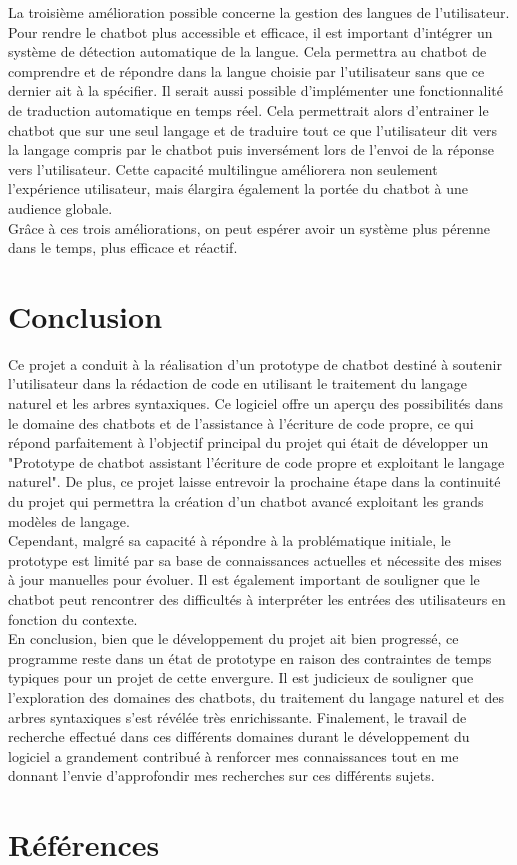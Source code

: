 \documentclass{rapport}
\begin{document}
La troisième amélioration possible concerne la gestion des langues de l'utilisateur. Pour rendre le chatbot plus accessible et efficace, il est important d'intégrer un système de détection automatique de la langue. Cela permettra au chatbot de comprendre et de répondre dans la langue choisie par l'utilisateur sans que ce dernier ait à la spécifier. Il serait aussi possible d'implémenter une fonctionnalité de traduction automatique en temps réel. Cela permettrait alors d'entrainer le chatbot que sur une seul langage et de traduire tout ce que l'utilisateur dit vers la langage compris par le chatbot puis inversément lors de l'envoi de la réponse vers l'utilisateur. Cette capacité multilingue améliorera non seulement l'expérience utilisateur, mais élargira également la portée du chatbot à une audience globale.\\

Grâce à ces trois améliorations, on peut espérer avoir un système plus pérenne dans le temps, plus efficace et réactif.
\newpage
\section{Conclusion}
\label{conclu}
Ce projet a conduit à la réalisation d'un prototype de chatbot destiné à soutenir l'utilisateur dans la rédaction de code en utilisant le traitement du langage naturel et les arbres syntaxiques. Ce logiciel offre un aperçu des possibilités dans le domaine des chatbots et de l'assistance à l'écriture de code propre, ce qui répond parfaitement à l'objectif principal du projet qui était de développer un "Prototype de chatbot assistant l'écriture de code propre et exploitant le langage naturel". De plus, ce projet laisse entrevoir la prochaine étape dans la continuité du projet qui permettra la création d'un chatbot avancé exploitant les grands modèles de langage.\\

Cependant, malgré sa capacité à répondre à la problématique initiale, le prototype est limité par sa base de connaissances actuelles et nécessite des mises à jour manuelles pour évoluer. Il est également important de souligner que le chatbot peut rencontrer des difficultés à interpréter les entrées des utilisateurs en fonction du contexte.\\

En conclusion, bien que le développement du projet ait bien progressé, ce programme reste dans un état de prototype en raison des contraintes de temps typiques pour un projet de cette envergure. Il est judicieux de souligner que l'exploration des domaines des chatbots, du traitement du langage naturel et des arbres syntaxiques s'est révélée très enrichissante. Finalement, le travail de recherche effectué dans ces différents domaines durant le développement du logiciel a grandement contribué à renforcer mes connaissances tout en me donnant l'envie d'approfondir mes recherches sur ces différents sujets.

\newpage
\section{Références} 



\newpage
\listoffigures

\newpage
\listoftables

\newpage
\listofalgorithms
\end{document}
